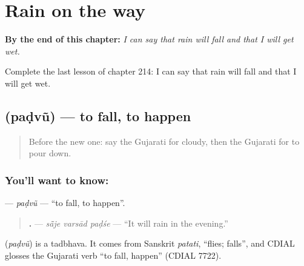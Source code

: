 
\chapter{Rain on the way}
\label{ch:gu-rain-on-the-way}

\begin{chapteropening}
\textbf{By the end of this chapter:} \emph{I can say that rain will fall and that I will get wet.}

Complete the last lesson of chapter 214: I can say that rain will fall and that I will get wet.
\end{chapteropening}

\section[\texorpdfstring{\gu{પડવું} (paḍvũ)}{પડવું (paḍvũ)}]{ (paḍvũ) — to fall, to happen}

\label{lesson:GU-C214-padvu}



\begin{quote}
Before the new one: say the Gujarati for cloudy, then the Gujarati for to pour down.
\end{quote}

\subsection*{You'll want to know: }
\textbf{} — \emph{paḍvũ} — \textquotedblleft{}to fall, to happen\textquotedblright{}.

\begin{quote}
\textbf{  .} — \emph{sā̃je varsād paḍśe} — \textquotedblleft{}It will rain in the evening.\textquotedblright{}
\end{quote}

\begin{cousinweb}
\textbf{} (\emph{paḍvũ}) is a tadbhava. It comes from Sanskrit \emph{patati}, \textquotedblleft{}flies; falls\textquotedblright{}, and CDIAL glosses the Gujarati verb \textquotedblleft{}to fall, happen\textquotedblright{} (CDIAL 7722).
\end{cousinweb}


